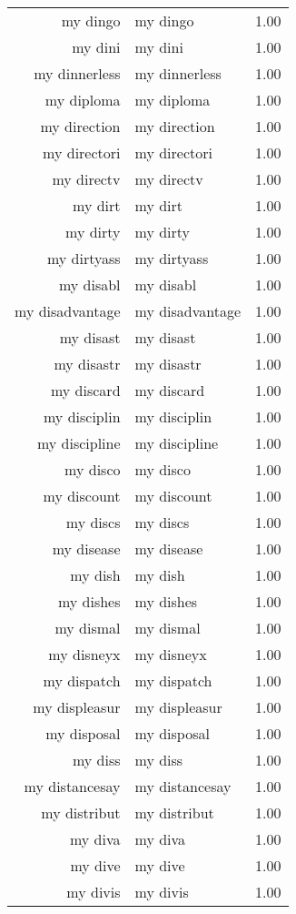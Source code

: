 \begin{table}[ht]
\begin{tabular}{rlr}
  my dingo & my dingo & 1.00 \\ 
  my dini & my dini & 1.00 \\ 
  my dinnerless & my dinnerless & 1.00 \\ 
  my diploma & my diploma & 1.00 \\ 
  my direction & my direction & 1.00 \\ 
  my directori & my directori & 1.00 \\ 
  my directv & my directv & 1.00 \\ 
  my dirt & my dirt & 1.00 \\ 
  my dirty & my dirty & 1.00 \\ 
  my dirtyass & my dirtyass & 1.00 \\ 
  my disabl & my disabl & 1.00 \\ 
  my disadvantage & my disadvantage & 1.00 \\ 
  my disast & my disast & 1.00 \\ 
  my disastr & my disastr & 1.00 \\ 
  my discard & my discard & 1.00 \\ 
  my disciplin & my disciplin & 1.00 \\ 
  my discipline & my discipline & 1.00 \\ 
  my disco & my disco & 1.00 \\ 
  my discount & my discount & 1.00 \\ 
  my discs & my discs & 1.00 \\ 
  my disease & my disease & 1.00 \\ 
  my dish & my dish & 1.00 \\ 
  my dishes & my dishes & 1.00 \\ 
  my dismal & my dismal & 1.00 \\ 
  my disneyx & my disneyx & 1.00 \\ 
  my dispatch & my dispatch & 1.00 \\ 
  my displeasur & my displeasur & 1.00 \\ 
  my disposal & my disposal & 1.00 \\ 
  my diss & my diss & 1.00 \\ 
  my distancesay & my distancesay & 1.00 \\ 
  my distribut & my distribut & 1.00 \\ 
  my diva & my diva & 1.00 \\ 
  my dive & my dive & 1.00 \\ 
  my divis & my divis & 1.00 \\ 

\end{tabular}
\end{table}
